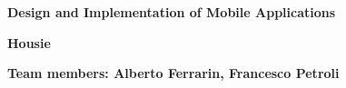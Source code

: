 \documentclass{article}
\begin{document}
\begin{center}
\large{\textbf{Design and Implementation of Mobile Applications}}

\vspace{1cm}
\large{\textbf{Housie}}

\vspace{1cm}
\large{\textbf{Team members: Alberto Ferrarin, Francesco Petroli}}
\end{center}
\end{document}
